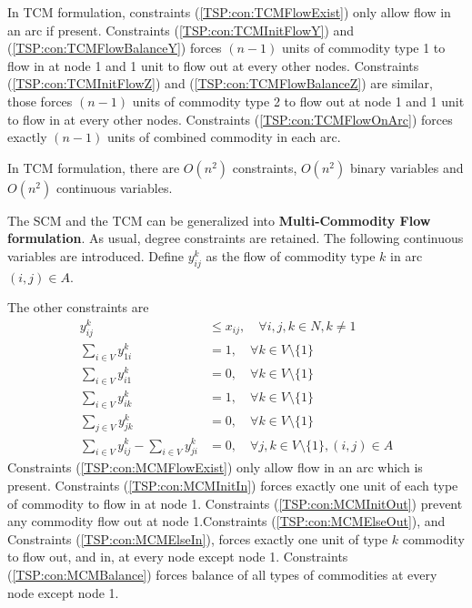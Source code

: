					In TCM formulation, constraints (\ref{TSP:con:TCMFlowExist}) only allow flow in an arc if present. Constraints (\ref{TSP:con:TCMInitFlowY}) and (\ref{TSP:con:TCMFlowBalanceY}) forces $(n - 1)$ units of commodity type 1 to flow in at node 1 and 1 unit to flow out at every other nodes. Constraints (\ref{TSP:con:TCMInitFlowZ}) and (\ref{TSP:con:TCMFlowBalanceZ}) are similar, those forces $(n - 1)$ units of commodity type 2 to flow out at node 1 and 1 unit to flow in at every other nodes. Constraints (\ref{TSP:con:TCMFlowOnArc}) forces exactly $(n - 1)$ units of combined commodity in each arc.

					In TCM formulation, there are $O(n^2)$ constraints, $O(n^2)$ binary variables and $O(n^2)$ continuous variables.

					The SCM and the TCM can be generalized into \textbf{Multi-Commodity Flow formulation}. As usual, degree constraints are retained. The following continuous variables are introduced. Define $y_{ij}^k$ as the flow of commodity type $k$ in arc $(i, j) \in A$.

					The other constraints are
					\begin{align}
						y_{ij}^k &\le x_{ij}, \quad \forall i, j, k \in N, k \neq 1 \label{TSP:con:MCMFlowExist}\\
						\sum_{i \in V} y_{1i}^k &= 1, \quad \forall k \in V \setminus \{1\} \label{TSP:con:MCMInitIn}\\
						\sum_{i \in V} y_{i1}^k &= 0, \quad \forall k \in V \setminus \{1\} \label{TSP:con:MCMInitOut}\\
						\sum_{i \in V} y_{ik}^k &= 1, \quad \forall k \in V \setminus \{1\} \label{TSP:con:MCMElseOut}\\
						\sum_{j \in V} y_{jk}^k &= 0, \quad \forall k \in V \setminus \{1\} \label{TSP:con:MCMElseIn}\\
						\sum_{i \in V} y_{ij}^k - \sum_{i \in V} y_{ji}^k &= 0, \quad \forall j, k \in V \setminus \{1\}, (i, j) \in A \label{TSP:con:MCMBalance}
					\end{align}
					Constraints (\ref{TSP:con:MCMFlowExist}) only allow flow in an arc which is present. Constraints (\ref{TSP:con:MCMInitIn}) forces exactly one unit of each type of commodity to flow in at node 1. Constraints (\ref{TSP:con:MCMInitOut}) prevent any commodity flow out at node 1.Constraints (\ref{TSP:con:MCMElseOut}), and Constraints (\ref{TSP:con:MCMElseIn}), forces exactly one unit of type $k$ commodity to flow out, and in, at every node except node 1. Constraints (\ref{TSP:con:MCMBalance}) forces balance of all types of commodities at every node except node 1.

